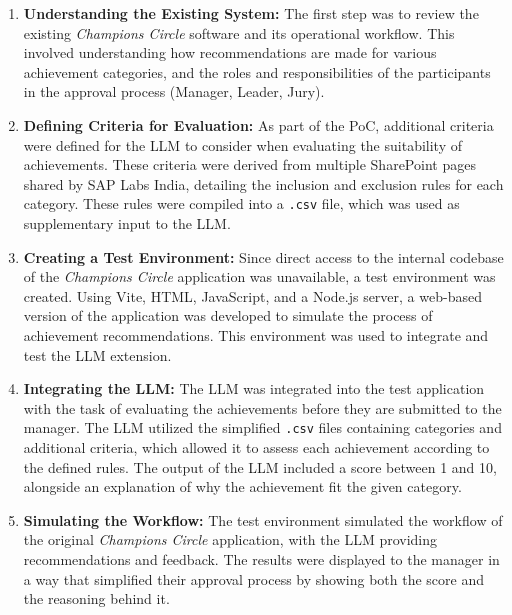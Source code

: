 \begin{enumerate}
    \item \textbf{Understanding the Existing System:} The first step was to review the existing \textit{Champions Circle} software and its operational workflow. 
    This involved understanding how recommendations are made for various achievement categories, 
    and the roles and responsibilities of the participants in the approval process (Manager, Leader, Jury).
    
    \item \textbf{Defining Criteria for Evaluation:} As part of the \ac{PoC}, additional criteria were defined for the \ac{LLM} to consider when evaluating the suitability of achievements. 
    These criteria were derived from multiple SharePoint pages shared by SAP Labs India, detailing the inclusion and exclusion rules for each category. 
    These rules were compiled into a \texttt{.csv} file, which was used as supplementary input to the \ac{LLM}.
    
    \item \textbf{Creating a Test Environment:} Since direct access to the internal codebase of the \textit{Champions Circle} application was unavailable, a test environment was created. 
    Using Vite, HTML, JavaScript, and a Node.js server, a web-based version of the application was developed to simulate the process of achievement recommendations. 
    This environment was used to integrate and test the \ac{LLM} extension.
    
    \item \textbf{Integrating the \ac{LLM}:} The \ac{LLM} was integrated into the test application with the task of evaluating the achievements before they are submitted to the manager. 
    The \ac{LLM} utilized the simplified \texttt{.csv} files containing categories and additional criteria, which allowed it to assess each achievement according to the defined rules. 
    The output of the \ac{LLM} included a score between 1 and 10, alongside an explanation of why the achievement fit the given category.
    
    \item \textbf{Simulating the Workflow:} The test environment simulated the workflow of the original \textit{Champions Circle} application, 
    with the \ac{LLM} providing recommendations and feedback. 
    The results were displayed to the manager in a way that simplified their approval process by showing both the score and the reasoning behind it.
\end{enumerate}

